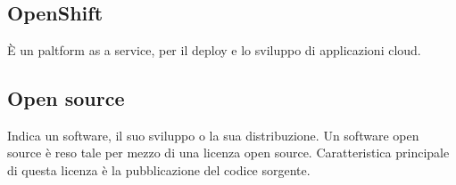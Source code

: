 \section{}
\subsection*{OpenShift} È un paltform as a service, per il deploy e lo sviluppo di applicazioni cloud. 

\subsection*{Open source} Indica un software, il suo sviluppo o la sua distribuzione. Un software open source è reso tale per mezzo di una licenza open source. Caratteristica principale di questa licenza è la pubblicazione del codice sorgente.
